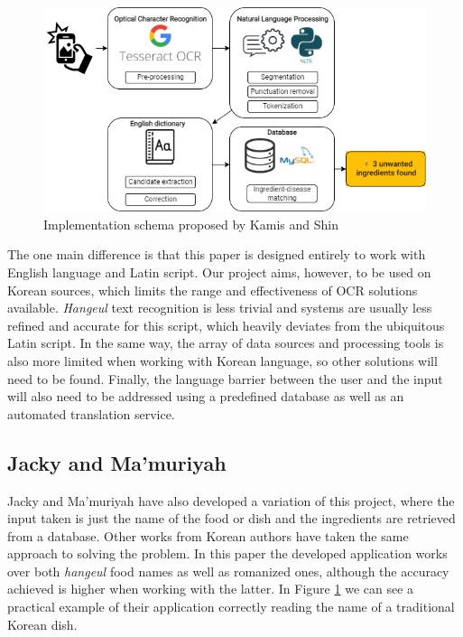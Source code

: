 \begin{figure}[h]
  \centering
  \includegraphics[width=\textwidth]{Figures/kamis.png}
  \caption{%
    Implementation schema proposed by Kamis and Shin
  }
  \label{fig:kamis}
\end{figure}

The one main difference is that this paper is designed entirely to work with English language and Latin script. Our project aims, however, to be used on Korean sources, which limits the range and effectiveness of OCR solutions available. \textit{Hangeul} text recognition is less trivial and systems are usually less refined and accurate for this script, which heavily deviates from the ubiquitous Latin script. In the same way, the array of data sources and processing tools is also more limited when working with Korean language, so other solutions will need to be found. Finally, the language barrier between the user and the input will also need to be addressed using a predefined database as well as an automated translation service.

\subsection{Jacky and Ma'muriyah}

Jacky and Ma'muriyah \cite{mamuriyah_perancangan_2021} have also developed a variation of this project, where the input taken is just the name of the food or dish and the ingredients are retrieved from a database. Other works from Korean authors \cite{lee_development_2017,yoon_web-app_2021} have taken the same approach to solving the problem. In this paper the developed application works over both \textit{hangeul} food names as well as romanized ones, although the accuracy achieved is higher when working with the latter. In Figure \ref{fig:kamis} we can see a practical example of their application correctly reading the name of a traditional Korean dish.

